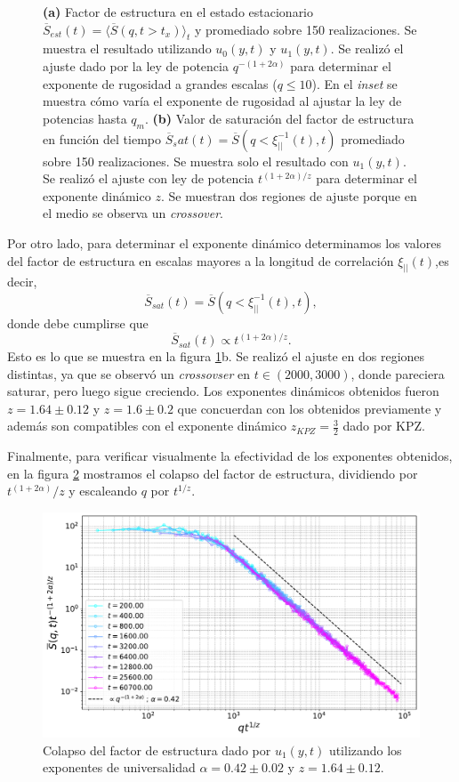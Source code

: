 \begin{figure}[t]
\begin{subfigure}{0.55\textwidth}
    \caption{}
\end{subfigure}
    \caption{\textbf{(a)} Factor de estructura en el estado estacionario $\overline{S}_{est}(t)=\langle \overline{S}(q,t>t_x)\rangle_t$ y promediado sobre 150 realizaciones. Se muestra el resultado utilizando $u_0(y,t)$ y $u_1(y,t)$. Se realizó el ajuste dado por la ley de potencia $q^{-(1+2\alpha)}$ para determinar el exponente de rugosidad a grandes escalas ($q\le 10$). En el \textit{inset} se muestra cómo varía el exponente de rugosidad al ajustar la ley de potencias hasta $q_m$. \textbf{(b)} Valor de saturación del factor de estructura en función del tiempo $\overline{S}_sat(t) = \overline{S}(q<\xi^{-1}_{||}(t),t)$ promediado sobre 150 realizaciones. Se muestra solo el resultado con $u_1(y,t)$. Se realizó el ajuste con ley de potencia $t^{(1+2\alpha)/z}$ para determinar el exponente dinámico $z$. Se muestran dos regiones de ajuste porque en el medio se observa un \textit{crossover}.}
    \label{fig:Sq_est_sat}
\end{figure}

Por otro lado, para determinar el exponente dinámico determinamos los valores del factor de estructura en escalas mayores a la longitud de correlación $\xi_{||}(t)$,es decir,
\begin{equation}
    \overline{S}_{sat}(t) = \overline{S}(q<\xi^{-1}_{||}(t),t),
\end{equation}
donde debe cumplirse que
\begin{equation}
    \overline{S}_{sat}(t) \propto t^{(1+2\alpha)/z}.
\end{equation}
Esto es lo que se muestra en la figura \ref{fig:Sq_est_sat}b. Se realizó el ajuste en dos regiones distintas, ya que se observó un \textit{crossovser} en $t\in(2000,3000)$, donde pareciera saturar, pero luego sigue creciendo. Los exponentes dinámicos obtenidos fueron $z = 1.64 \pm 0.12$ y $z = 1.6 \pm 0.2$ que concuerdan con los obtenidos previamente y además son compatibles con el exponente dinámico $z_{KPZ} = \frac{3}{2}$ dado por KPZ.

Finalmente, para verificar visualmente la efectividad de los exponentes obtenidos, en la figura \ref{fig:Sq_colapse} mostramos el colapso del factor de estructura, dividiendo por $t^(1+2\alpha)/z$ y escaleando $q$ por $t^{1/z}$.

\begin{figure}[h]
    \centering
    \includegraphics[width=\imsizeL]{Sq_colapse.pdf}
    \caption{Colapso del factor de estructura dado por $u_1(y,t)$ utilizando los exponentes de universalidad $\alpha = 0.42\pm0.02$ y $z = 1.64 \pm 0.12$.}
    \label{fig:Sq_colapse}
\end{figure}

